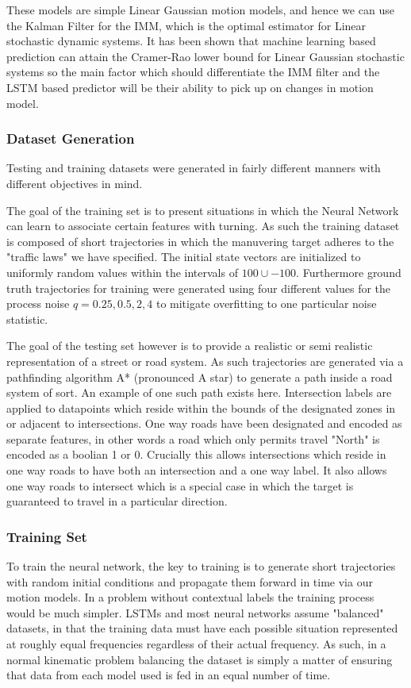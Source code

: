 \documentclass[twocolumn,letterpaper]{IEEEAerospaceCLS}  %
\begin{document}
These models are simple Linear Gaussian motion models, and hence we can use the Kalman Filter for the IMM, which is the optimal estimator for Linear stochastic dynamic systems. It has been shown that machine learning based prediction can attain the Cramer-Rao lower bound for Linear Gaussian stochastic systems so the main factor which should differentiate the IMM filter and the LSTM based predictor will be their ability to pick up on changes in motion model.


\subsubsection{Dataset Generation}
Testing and training datasets were generated in fairly different manners with different objectives in mind.

The goal of the training set is to present situations in which the Neural Network can learn to associate certain features with turning. As such the training dataset is composed of short trajectories in which the manuvering target adheres to the "traffic laws" we have specified. The initial state vectors are initialized to uniformly random values within the intervals of $100 \cup-100$. Furthermore ground truth trajectories for training were generated using four different values for the process noise $q = 0.25,0.5,2,4$ to mitigate overfitting to one particular noise statistic.

The goal of the testing set however is to provide a realistic or semi realistic representation of a street or road system. As such trajectories are generated via a pathfinding algorithm A* (pronounced A star) to generate a path inside a road system of sort. An example of one such path exists here. Intersection labels are applied to datapoints which reside within the bounds of the designated zones in or adjacent to intersections. One way roads have been designated and encoded as separate features, in other words a road which only permits travel "North" is encoded as a boolian 1 or 0. Crucially this allows intersections which reside in one way roads to have both an intersection and a one way label. It also allows one way roads to intersect which is a special case in which the target is guaranteed to travel in a particular direction.


\subsubsection{Training Set}
To train the neural network, the key to training is to generate short trajectories with random initial conditions and propagate them forward in time via our motion models. In a problem without contextual labels the training process would be much simpler. LSTMs and most neural networks assume "balanced" datasets, in that the training data must have each possible situation represented at roughly equal frequencies regardless of their actual frequency. As such, in a normal kinematic problem balancing the dataset is simply a matter of ensuring that data from each model used is fed in an equal number of time.
\end{document}
